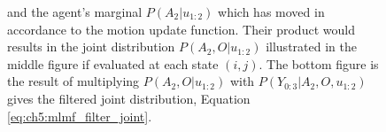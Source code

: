 \begin{figure}
{ and the agent's marginal $P(A_2|u_{1:2})$ which has moved in accordance to the motion update function. Their product would results in 
 the joint distribution $P(A_2,O|u_{1:2})$ illustrated in the middle figure if evaluated at each state $(i,j)$. The bottom figure is the result
 of multiplying $P(A_2,O|u_{1:2})$ with  $P(Y_{0:3}|A_2,O,u_{1:2})$ gives the filtered joint distribution, Equation \ref{eq:ch5:mlmf_filter_joint}.
 }
 \label{fig:maringal_joint_example_v2}
\end{figure}
 




